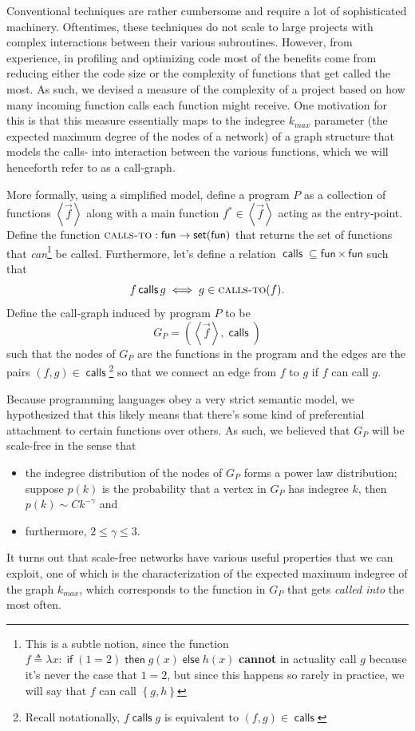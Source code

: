 \documentclass[11pt,a4paper]{article}
\newcommand {\coo} [1] {\ensuremath{\operatorname{\mathsf{#1}}}}
\newcommand {\co} [1] {\coo{#1}}
\newcommand {\Iff}[3] {\co{if} (#1) \co{then} #2 \co{else} #3}
\newcommand{\Rec}[1]{\left\{#1\right\}}
\newcommand{\pa}[1]{\left(#1\right)}
\newcommand{\ba}[1]{\left\langle #1\right\rangle}
\newcommand{\f}[1]{\textsc{#1}}
\newcommand{\g}[1]{\textsf{#1}}
\begin{document}
Conventional techniques are rather cumbersome and require a lot of 
sophisticated machinery. Oftentimes, these techniques do not scale to large 
projects with complex interactions between their various subroutines. However, 
from experience, in profiling and optimizing code most of the 
benefits come from reducing either the code size or the complexity of 
functions that get called the most. As such, we devised a measure of the 
complexity of a project based on how many incoming function calls each 
function might receive. One motivation for this is that this measure 
essentially maps to the indegree $k_{max}$ parameter (the expected maximum 
degree of the nodes of a network) of a graph structure that models the calls-
into interaction between the various functions, which we will henceforth
refer to as a call-graph.

More formally, using a simplified model,  define a program $P$ as a 
collection of functions $\ba{\vec f}$ along with a main function 
$f^* \in \ba{\vec f}$ acting as the entry-point. Define the function 
$\f{calls-to}: \g{fun} \to \g{set}(\g{fun})$ that returns the set of functions 
that \textit{can}\footnote{This is a subtle notion, since the 
function $f \triangleq \lambda x: \Iff{1 = 2}{g(x)}{h(x)}$ \textbf{cannot} in 
actuality call $g$ because it's never the case that $1 = 2$, but since this 
happens so rarely in practice, we will say that $f$ can call $\Rec{g,h}$} be 
called. Furthermore, let's define a relation 
$\co{calls} \subseteq \g{fun} \times \g{fun}$ such that 
$$f \co{calls} g \iff g \in \f{calls-to}(f).$$
Define the call-graph induced by program $P$ to be 
$$G_P = \pa{\ba{\vec f}, \co{calls}}$$
such that the nodes of $G_P$ are the functions in the program and the edges 
are the pairs $(f,g) \in \co{calls}$\footnote{Recall notationally, 
$f\co{calls}g$ is equivalent to $(f,g) \in \co{calls}$} so that we connect an 
edge from $f$ to $g$ if $f$ can call $g$.

Because programming languages obey a very strict semantic model, we 
hypothesized that this likely means that there's some kind of preferential 
attachment to certain functions over others. As such, we believed that $G_P$ 
will be scale-free in the sense that\cite{DUR}
\begin{itemize}
\item the indegree distribution of the nodes of $G_P$ forms a power law 
distribution; suppose $p(k)$ is the probability that a vertex in $G_P$ has 
indegree $k$, then $p(k) \sim C k^{-\gamma}$ and
\item furthermore, $2 \le \gamma \le 3$.
\end{itemize}
It turns out that scale-free networks have various useful properties that we 
can exploit, one of which is the characterization of the expected maximum 
indegree of the graph $k_{max}$, which corresponds to the function in $G_P$ 
that gets \emph{called into} the most often. 
\end{document}
